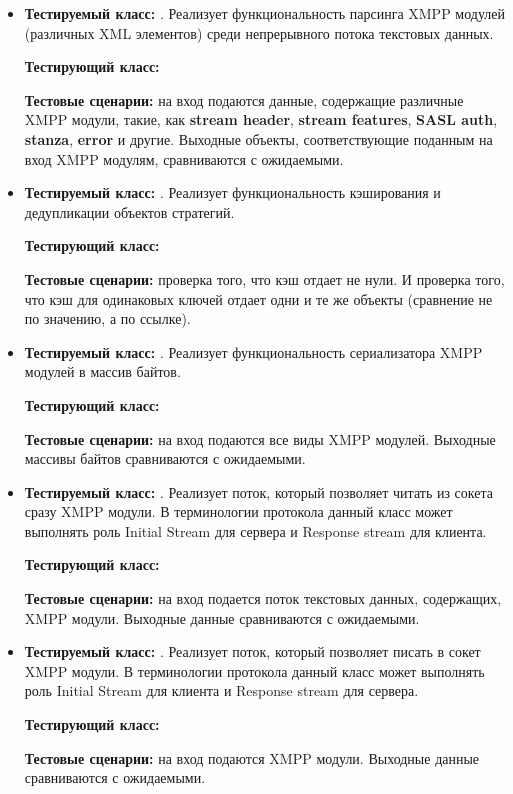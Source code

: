 \begin{itemize}
	\item \textbf{Тестируемый класс:} . Реализует функциональность парсинга XMPP модулей (различных XML элементов) среди непрерывного потока текстовых данных.
	
	\textbf{Тестирующий класс:} 
	
	\textbf{Тестовые сценарии:} на вход подаются данные, содержащие различные XMPP модули, такие, как \textbf{stream header}, \textbf{stream features}, \textbf{SASL auth}, \textbf{stanza}, \textbf{error} и другие. Выходные объекты, соответствующие поданным на вход XMPP модулям, сравниваются с ожидаемыми.
	
	
	\item \textbf{Тестируемый класс:} . Реализует функциональность кэширования и дедупликации объектов стратегий.
	
	\textbf{Тестирующий класс:} 
	
	\textbf{Тестовые сценарии:} проверка того, что кэш отдает не нули. И проверка того, что кэш для одинаковых ключей отдает одни и те же объекты (сравнение не по значению, а по ссылке).
	
	
	\item \textbf{Тестируемый класс:} . Реализует функциональность сериализатора XMPP модулей в массив байтов.
	
	\textbf{Тестирующий класс:} 
	
	\textbf{Тестовые сценарии:} на вход подаются все виды XMPP модулей. Выходные массивы байтов сравниваются с ожидаемыми.
	
	
	\item \textbf{Тестируемый класс:} . Реализует поток, который позволяет читать из сокета сразу XMPP модули. В терминологии протокола данный класс может выполнять роль Initial Stream для сервера и Response stream для клиента.
	
	\textbf{Тестирующий класс:} 
	
	\textbf{Тестовые сценарии:} на вход подается поток текстовых данных, содержащих, XMPP модули. Выходные данные сравниваются с ожидаемыми.
	
	
	\item  \textbf{Тестируемый класс:} . Реализует поток, который позволяет писать в сокет XMPP модули. В терминологии протокола данный класс может выполнять роль Initial Stream для клиента и Response stream для сервера.
	
	\textbf{Тестирующий класс:} 
	
	\textbf{Тестовые сценарии:} на вход подаются XMPP модули. Выходные данные сравниваются с ожидаемыми.
\end{itemize}

